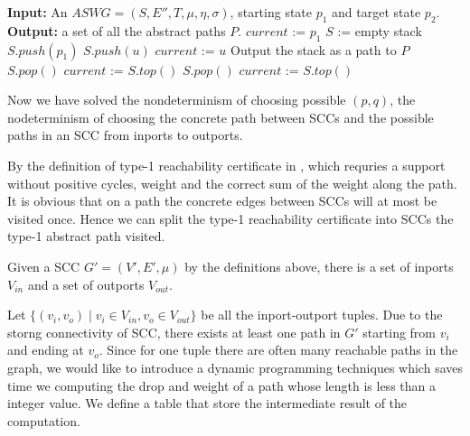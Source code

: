 \documentclass[12pt]{article}
\begin{document}
\begin{itemize}
\begin{algorithm}
\begin{algorithmic}
		\State {}
			\State \textbf{Input: }An $ASWG = (S,E'',T,\mu,\eta,\sigma)$, starting state $p_1$ and target state $p_2$.
			\State \textbf{Output: }a set of all the abstract paths $P$.
			\State $current$ := $p_1$
			\State $S$ := empty stack
			\State $S.push(p_1)$
				\State $S.push(u)$
				\State $current$ := $u$
					\State Output the stack as a path to $P$
					\State $S.pop()$
					\State $current$ := $S.top()$
				\EndIf				
					\State $S.pop()$
					\State $current$ := $S.top()$
				\EndIf
			\EndWhile
		\EndFunction
	\end{algorithmic}
\end{algorithm}

Now we have solved the nondeterminism of choosing possible $(p,q)$, the nodeterminism of choosing the concrete path between SCCs and the possible paths in an SCC from inports to outports. 



By the definition of type-1 reachability certificate in \cite{DBLP:conf/icalp/ChistikovH17}, which requries a support without positive cycles, weight and the correct sum of the weight along the path. It is obvious that on a path the concrete edges between SCCs will at most be visited once. Hence we can split the type-1 reachability certificate into SCCs the type-1 abstract path visited.


Given a SCC $G' = (V', E', \mu)$ by the definitions above, there is a set of inports $V_{in}$ and a set of outports $V_{out}$.

Let $\{(v_{i}, v_{o})\mid v_i\in V_{in}, v_o \in V_{out}\}$  be all the inport-outport tuples. Due to the storng connectivity of SCC, there exists at least one path in $G'$ starting from $v_i$ and ending at $v_o$. Since for one tuple there are often many reachable paths in the graph, we would like to introduce a dynamic programming techniques which saves time we computing the drop and weight of a path whose length is less than a integer value. We define a table that store the intermediate result of the computation.




\end{itemize}
\end{document}
